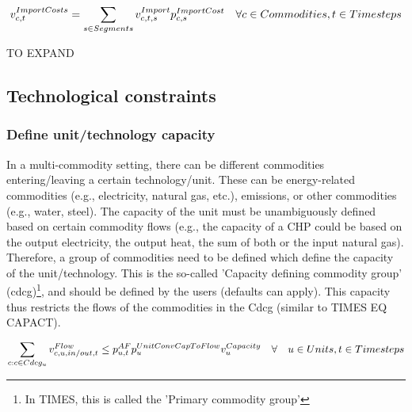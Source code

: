 \begin{align}
v^{ImportCosts}_{c,t} = \sum_{s \in Segments} v^{Import}_{c,t,s} p^{ImportCost}_{c,s} \quad \forall c \in Commodities, t \in Timesteps
\end{align}

{\color{red} TO EXPAND}






\subsection{Technological constraints}

\subsubsection{Define unit/technology capacity}

In a multi-commodity setting, there can be different commodities entering/leaving a certain technology/unit. These can be energy-related commodities (e.g., electricity, natural gas, etc.), emissions, or other commodities (e.g., water, steel). The capacity of the unit must be unambiguously defined based on certain commodity flows (e.g., the capacity of a CHP could be based on the output electricity, the output heat, the sum of both or the input natural gas). Therefore, a group of commodities need to be defined which define the capacity of the unit/technology. This is the so-called 'Capacity defining commodity group' (cdcg)\footnote{In TIMES, this is called the 'Primary commodity group'}, and should be defined by the users (defaults can apply). This capacity thus restricts the flows of the commodities in the Cdcg (similar to TIMES EQ CAPACT).


\begin{equation} \label{eq:max_capacity}
\sum_{c : c \in Cdcg_{u}} v^{Flow}_{c,u,in/out,t} \le p^{AF}_{u,t} p^{UnitConvCapToFlow}_{u} v^{Capacity}_{u} \quad \forall \quad u \in Units, t \in Timesteps
\end{equation}



